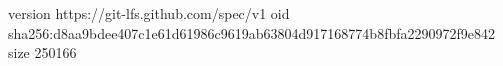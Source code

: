 version https://git-lfs.github.com/spec/v1
oid sha256:d8aa9bdee407c1e61d61986c9619ab63804d917168774b8fbfa2290972f9e842
size 250166

